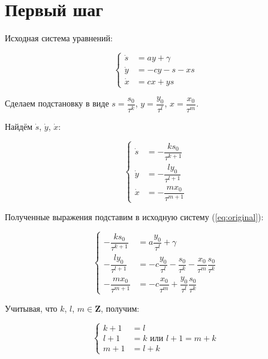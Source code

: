 \section{Первый шаг}

Исходная система уравнений:

\begin{equation}
\label{eq:original}
	\left\{
		\begin{aligned}
			\dot s &= ay + \gamma \\
			\dot y &= -cy -s -xs \\
			\dot x &= cx + ys
		\end{aligned}
	\right.
\end{equation}

Сделаем подстановку в виде $ s = \dfrac{s_0}{\tau^k} $, $ y = \dfrac{y_0}{\tau^l} $, $ x = \dfrac{x_0}{\tau^m} $.

Найдём $ \dot s $, $ \dot y $, $ \dot x $:

$$
	\left\{
		\begin{aligned}
			\dot s &= -\dfrac{ks_0}{\tau^{k+1}} \\
			\dot y &= -\dfrac{ly_0}{\tau^{l+1}} \\
			\dot x &= -\dfrac{mx_0}{\tau^{m+1}} 
		\end{aligned}
	\right.
$$

Полученные выражения подставим в исходную систему (\ref{eq:original}):

\begin{equation*}
\label{eq:step1}
	\left\{
		\begin{aligned}
			-\dfrac{ks_0}{\tau^{k+1}} &= a \dfrac{y_0}{\tau^l} + \gamma \\
			-\dfrac{ly_0}{\tau^{l+1}} &= -c \dfrac{y_0}{\tau^l} - \dfrac{s_0}{\tau^k} - \dfrac{x_0}{\tau^m} \dfrac{s_0}{\tau^k} \\
			-\dfrac{mx_0}{\tau^{m+1}} &= -c \dfrac{x_0}{\tau^m} + \dfrac{y_0}{\tau^l} \dfrac{s_0}{\tau^k}
		\end{aligned}
	\right.
\end{equation*}

Учитывая, что $ k $, $ l $, $ m \in \textbf{Z} $, получим:
 
$$
	\left\{
		\begin{aligned}
			k + 1 &= l \\
			l + 1 &= k \text{  или  } l + 1 = m + k \\
			m + 1 &= l + k 
		\end{aligned}
	\right.
$$

